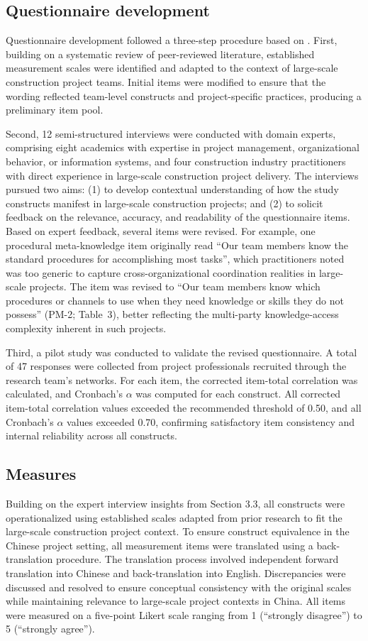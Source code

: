 \documentclass[authoryear,preprint,review,times,10pt]{elsarticle}
\begin{document}
\subsection{Questionnaire development}
Questionnaire development followed a three-step procedure based on \citet{anderson1988Structural}. First, building on a systematic review of peer-reviewed literature, established measurement scales were identified and adapted to the context of large-scale construction project teams. Initial items were modified to ensure that the wording reflected team-level constructs and project-specific practices, producing a preliminary item pool.

Second, 12 semi-structured interviews were conducted with domain experts, comprising eight academics with expertise in project management, organizational behavior, or information systems, and four construction industry practitioners with direct experience in large-scale construction project delivery. The interviews pursued two aims: (1) to develop contextual understanding of how the study constructs manifest in large-scale construction projects; and (2) to solicit feedback on the relevance, accuracy, and readability of the questionnaire items. Based on expert feedback, several items were revised. For example, one procedural meta-knowledge item originally read ``Our team members know the standard procedures for accomplishing most tasks'', which practitioners noted was too generic to capture cross-organizational coordination realities in large-scale projects. The item was revised to ``Our team members know which procedures or channels to use when they need knowledge or skills they do not possess'' (PM-2; Table~3), better reflecting the multi-party knowledge-access complexity inherent in such projects.

Third, a pilot study was conducted to validate the revised questionnaire. A total of 47 responses were collected from project professionals recruited through the research team's networks. For each item, the corrected item-total correlation was calculated, and Cronbach's $\alpha$ was computed for each construct. All corrected item-total correlation values exceeded the recommended threshold of 0.50, and all Cronbach's $\alpha$ values exceeded 0.70, confirming satisfactory item consistency and internal reliability across all constructs.

\subsection{Measures}
Building on the expert interview insights from Section 3.3, all constructs were operationalized using established scales adapted from prior research to fit the large-scale construction project context. To ensure construct equivalence in the Chinese project setting, all measurement items were translated using a back-translation procedure. The translation process involved independent forward translation into Chinese and back-translation into English. Discrepancies were discussed and resolved to ensure conceptual consistency with the original scales while maintaining relevance to large-scale project contexts in China. All items were measured on a five-point Likert scale ranging from 1 (“strongly disagree”) to 5 (“strongly agree”). 
\end{document}
